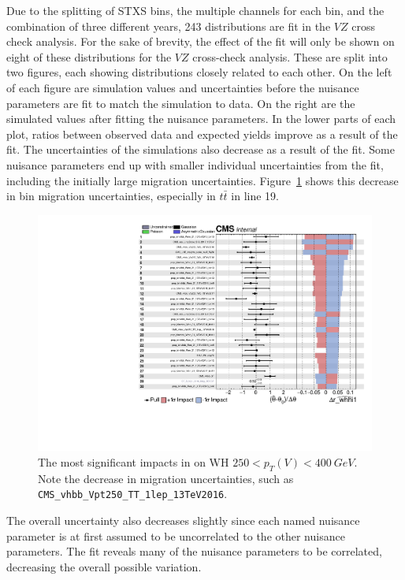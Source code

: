 Due to the splitting of STXS bins, the multiple channels for each bin, and the combination of three different years,
243 distributions are fit in the $V\!Z$ cross check analysis.
For the sake of brevity, the effect of the fit will only be shown on eight of these distributions for the $V\!Z$
cross-check analysis.
These are split into two figures, each showing distributions closely related to each other.
On the left of each figure are simulation values and uncertainties
before the nuisance parameters are fit to match the simulation to data.
On the right are the simulated values after fitting the nuisance parameters.
In the lower parts of each plot, ratios between observed data and expected yields improve as a result of the fit.
The uncertainties of the simulations also decrease as a result of the fit.
Some nuisance parameters end up with smaller individual uncertainties from the fit,
including the initially large migration uncertainties.
Figure~\ref{fig:impact-ex} shows this decrease in bin migration uncertainties,
especially in $t\bar{t}$ in line 19.
%
\begin{figure}
  \centering
  \includegraphics[width=0.85\linewidth,page=1]{figures/impacts/impacts_r_whhi1.pdf}
  \caption[Example impacts for WH $250 < p_T(V) < \SI{400}{GeV}$]{
    The most significant impacts in on WH $250 < p_T(V) < \SI{400}{GeV}$.
    Note the decrease in migration uncertainties, such as \texttt{CMS\_vhbb\_Vpt250\_TT\_1lep\_13TeV2016}.
  }
  \label{fig:impact-ex}
\end{figure}
%
The overall uncertainty also decreases slightly since each named nuisance parameter is at first
assumed to be uncorrelated to the other nuisance parameters.
The fit reveals many of the nuisance parameters to be correlated, decreasing the overall possible variation.

